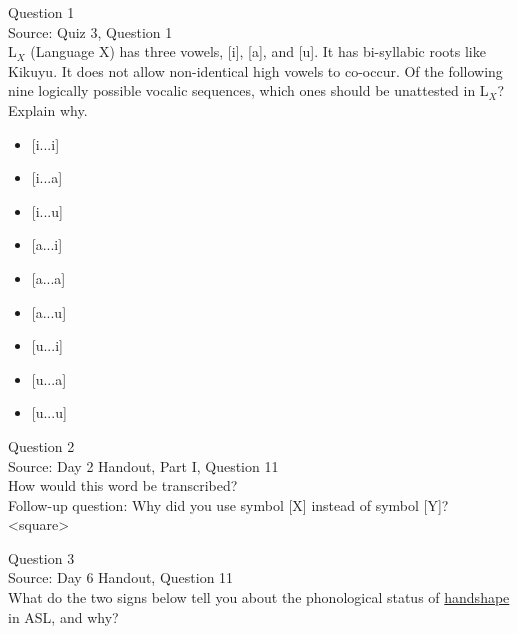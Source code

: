 \documentclass[12pt]{article}
\begin{document}
{\large Question 1}\\

Source: Quiz 3, Question 1\\

L$_X$ (Language X) has three vowels, [i], [a], and [u]. It has bi-syllabic roots like Kikuyu. It does not allow non-identical high vowels to co-occur. Of the following nine logically possible vocalic sequences, which ones should be unattested in L$_X$? Explain why.\\

\begin{itemize} \item {[i...i]} \item {[i...a]} \item {[i...u]} \item {[a...i]} \item {[a...a]} \item {[a...u]} \item {[u...i]} \item {[u...a]} \item {[u...u]} \end{itemize}


\newpage

{\large Question 2}\\

Source: Day 2 Handout, Part I, Question 11\\

How would this word be transcribed?\\ Follow-up question: Why did you use symbol [X] instead of symbol [Y]?\\

<square>


\newpage

{\large Question 3}\\

Source: Day 6 Handout, Question 11\\

What do the two signs below tell you about the phonological status of \underline{handshape} in ASL, and why?\\
\end{document}
